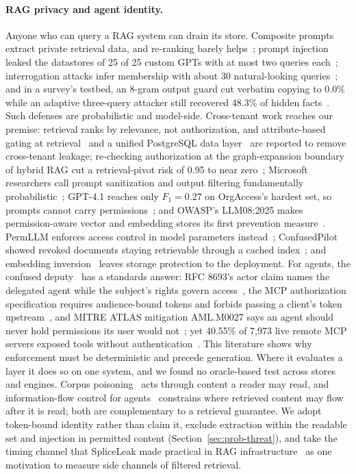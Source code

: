 \paragraph{RAG privacy and agent identity.}
Anyone who can query a RAG system can drain its store. Composite prompts extract private retrieval
data, and re-ranking barely helps~\cite{zeng2024good}; prompt injection leaked the datastores of 25 of
25 custom GPTs with at most two queries each~\cite{qi2024follow}; interrogation attacks infer
membership with about 30 natural-looking queries~\cite{naseh2025riddle}; and in a survey's testbed, an
8-gram output guard cut verbatim copying to 0.0\% while an adaptive three-query attacker still
recovered 48.3\% of hidden facts~\cite{liu2026protection}. Such defenses are probabilistic and
model-side. Cross-tenant work reaches our premise: retrieval ranks by relevance, not authorization,
and attribute-based gating at retrieval~\cite{arceo2026securing} and a unified PostgreSQL data layer~\cite{budigi2026beyond} are reported to remove cross-tenant leakage;
re-checking authorization at the graph-expansion boundary of hybrid RAG cut a retrieval-pivot risk of
0.95 to near zero~\cite{thornton2026retrieval}; Microsoft researchers call prompt sanitization and
output filtering fundamentally probabilistic~\cite{bhatt2025enterprise}; GPT-4.1 reaches only
$F_1 = 0.27$ on OrgAccess's hardest set, so prompts cannot carry permissions~\cite{sanyal2025orgaccess};
and OWASP's LLM08:2025 makes permission-aware vector and embedding stores its first prevention
measure~\cite{owasp2025llm082025}. PermLLM enforces access control in model parameters
instead~\cite{jayaraman2025permissioned}; ConfusedPilot showed revoked documents staying retrievable
through a cached index~\cite{roychowdhury2024confusedpilot}; and embedding
inversion~\cite{song2020information,li2023sentence,morris2023text,zhang2025universal} leaves storage
protection to the deployment. For agents, the confused deputy~\cite{hardy1988confused} has a
standards answer: RFC 8693's actor claim names the delegated agent while the subject's rights govern
access~\cite{jones2020oauth}, the MCP authorization specification requires audience-bound tokens and
forbids passing a client's token upstream~\cite{mcp2026model}, and MITRE ATLAS mitigation AML.M0027
says an agent should never hold permissions its user would not~\cite{mitre2026atlas}; yet 40.55\% of
7,973 live remote MCP servers exposed tools without authentication~\cite{zhou2026first}. This
literature shows why enforcement must be deterministic and precede generation. Where it evaluates a layer it does so on one system,
and we found no oracle-based test across stores and engines. Corpus
poisoning~\cite{zou2025poisonedrag} acts through content a reader may read, and information-flow
control for agents~\cite{costa2025securing,wu2024systemlevel} constrains where retrieved content may
flow after it is read; both are complementary to a retrieval guarantee. We adopt token-bound identity
rather than claim it, exclude extraction within the readable set and injection in permitted content
(Section~\ref{sec:prob-threat}), and take the timing channel that SpliceLeak made practical in RAG
infrastructure~\cite{sun2026agentassisted} as one motivation to measure side channels of filtered
retrieval.

